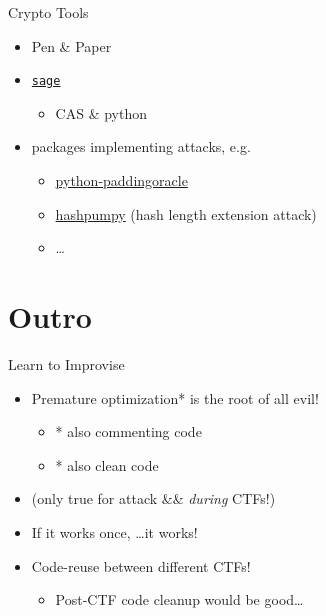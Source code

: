 \begin{frame}
  {Crypto Tools}

  \begin{itemize}
    \item Pen \& Paper
  \end{itemize}
  \begin{itemize}
    \item \texttt{\href{http://www.sagemath.org/}{sage}}
      \begin{itemize}
        \item CAS \& python
      \end{itemize}
    \item packages implementing attacks, e.g.
      \begin{itemize}
        \item \href{http://mwielgoszewski.github.io/python-paddingoracle/}
          {python-paddingoracle}
        \item \href{https://github.com/bwall/HashPump}{hashpumpy} (hash length extension attack)
        \item \ldots
      \end{itemize}
  \end{itemize}
\end{frame}


%


\section{Outro}

\begin{frame}
  {Learn to Improvise}

  \begin{itemize}
    \item Premature optimization* is the root of all evil!
      \begin{itemize}
        \item * also commenting code
        \item * also clean code
      \end{itemize}
    \item (only true for attack \&\&  \emph{during} CTFs!)
    \item If it works once, \ldots it works!
    \item Code-reuse between different CTFs!
      \begin{itemize}
        \item Post-CTF code cleanup would be good\ldots
      \end{itemize}
  \end{itemize}

\end{frame}

